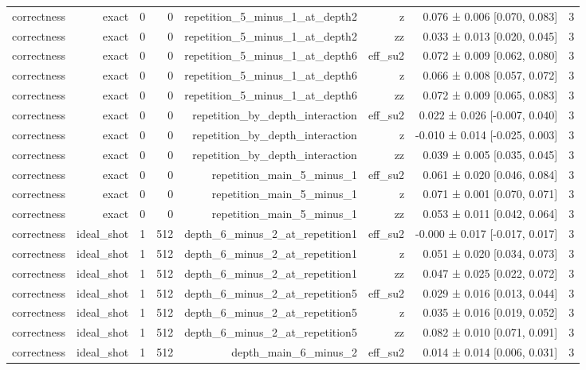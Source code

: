 \begin{table}
\begin{tabular}{lrrrrrrr}
correctness & exact & 0 & 0 & repetition\_5\_minus\_1\_at\_depth2 & z & 0.076 ± 0.006 [0.070, 0.083] & 3 \\
correctness & exact & 0 & 0 & repetition\_5\_minus\_1\_at\_depth2 & zz & 0.033 ± 0.013 [0.020, 0.045] & 3 \\
correctness & exact & 0 & 0 & repetition\_5\_minus\_1\_at\_depth6 & eff\_su2 & 0.072 ± 0.009 [0.062, 0.080] & 3 \\
correctness & exact & 0 & 0 & repetition\_5\_minus\_1\_at\_depth6 & z & 0.066 ± 0.008 [0.057, 0.072] & 3 \\
correctness & exact & 0 & 0 & repetition\_5\_minus\_1\_at\_depth6 & zz & 0.072 ± 0.009 [0.065, 0.083] & 3 \\
correctness & exact & 0 & 0 & repetition\_by\_depth\_interaction & eff\_su2 & 0.022 ± 0.026 [-0.007, 0.040] & 3 \\
correctness & exact & 0 & 0 & repetition\_by\_depth\_interaction & z & -0.010 ± 0.014 [-0.025, 0.003] & 3 \\
correctness & exact & 0 & 0 & repetition\_by\_depth\_interaction & zz & 0.039 ± 0.005 [0.035, 0.045] & 3 \\
correctness & exact & 0 & 0 & repetition\_main\_5\_minus\_1 & eff\_su2 & 0.061 ± 0.020 [0.046, 0.084] & 3 \\
correctness & exact & 0 & 0 & repetition\_main\_5\_minus\_1 & z & 0.071 ± 0.001 [0.070, 0.071] & 3 \\
correctness & exact & 0 & 0 & repetition\_main\_5\_minus\_1 & zz & 0.053 ± 0.011 [0.042, 0.064] & 3 \\
correctness & ideal\_shot & 1 & 512 & depth\_6\_minus\_2\_at\_repetition1 & eff\_su2 & -0.000 ± 0.017 [-0.017, 0.017] & 3 \\
correctness & ideal\_shot & 1 & 512 & depth\_6\_minus\_2\_at\_repetition1 & z & 0.051 ± 0.020 [0.034, 0.073] & 3 \\
correctness & ideal\_shot & 1 & 512 & depth\_6\_minus\_2\_at\_repetition1 & zz & 0.047 ± 0.025 [0.022, 0.072] & 3 \\
correctness & ideal\_shot & 1 & 512 & depth\_6\_minus\_2\_at\_repetition5 & eff\_su2 & 0.029 ± 0.016 [0.013, 0.044] & 3 \\
correctness & ideal\_shot & 1 & 512 & depth\_6\_minus\_2\_at\_repetition5 & z & 0.035 ± 0.016 [0.019, 0.052] & 3 \\
correctness & ideal\_shot & 1 & 512 & depth\_6\_minus\_2\_at\_repetition5 & zz & 0.082 ± 0.010 [0.071, 0.091] & 3 \\
correctness & ideal\_shot & 1 & 512 & depth\_main\_6\_minus\_2 & eff\_su2 & 0.014 ± 0.014 [0.006, 0.031] & 3 \\

\end{tabular}
\end{table}
